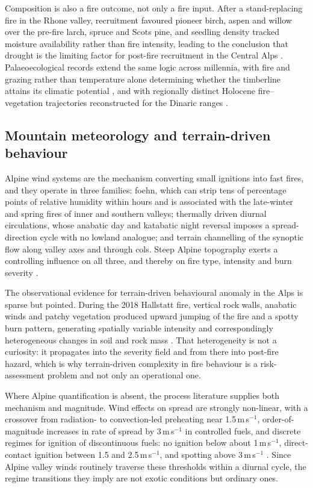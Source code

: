 \documentclass[11pt,a4paper]{article}
\begin{document}
Composition is also a fire outcome, not only a fire input. After a stand-replacing fire in the Rhone valley, recruitment favoured pioneer birch, aspen and willow over the pre-fire larch, spruce and Scots pine, and seedling density tracked moisture availability rather than fire intensity, leading to the conclusion that drought is the limiting factor for post-fire recruitment in the Central Alps \citep{moser_potential_2010}. Palaeoecological records extend the same logic across millennia, with fire and grazing rather than temperature alone determining whether the timberline attains its climatic potential \citep{colombaroli_species_2010}, and with regionally distinct Holocene fire--vegetation trajectories reconstructed for the Dinaric ranges \citep{cagliero_effect_nodate}.

\subsection{Mountain meteorology and terrain-driven behaviour}

Alpine wind systems are the mechanism converting small ignitions into fast fires, and they operate in three families: foehn, which can strip tens of percentage points of relative humidity within hours and is associated with the late-winter and spring fires of inner and southern valleys; thermally driven diurnal circulations, whose anabatic day and katabatic night reversal imposes a spread-direction cycle with no lowland analogue; and terrain channelling of the synoptic flow along valley axes and through cols. Steep Alpine topography exerts a controlling influence on all three, and thereby on fire type, intensity and burn severity \citep{melzner_wildfire-induced_2025}.

The observational evidence for terrain-driven behavioural anomaly in the Alps is sparse but pointed. During the 2018 Hallstatt fire, vertical rock walls, anabatic winds and patchy vegetation produced upward jumping of the fire and a spotty burn pattern, generating spatially variable intensity and correspondingly heterogeneous changes in soil and rock mass \citep{melzner_brief_2019}. That heterogeneity is not a curiosity: it propagates into the severity field and from there into post-fire hazard, which is why terrain-driven complexity in fire behaviour is a risk-assessment problem and not only an operational one.

Where Alpine quantification is absent, the process literature supplies both mechanism and magnitude. Wind effects on spread are strongly non-linear, with a crossover from radiation- to convection-led preheating near 1.5\,m\,s$^{-1}$, order-of-magnitude increases in rate of spread by 3\,m\,s$^{-1}$ in controlled fuels, and discrete regimes for ignition of discontinuous fuels: no ignition below about 1\,m\,s$^{-1}$, direct-contact ignition between 1.5 and 2.5\,m\,s$^{-1}$, and spotting above 3\,m\,s$^{-1}$ \citep{hayajneh_wind_2026}. Since Alpine valley winds routinely traverse these thresholds within a diurnal cycle, the regime transitions they imply are not exotic conditions but ordinary ones.
\end{document}
